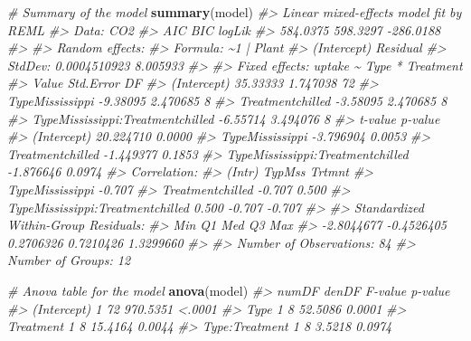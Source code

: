 \documentclass[
]{book}
\newenvironment{Shaded}{\begin{snugshade}}{\end{snugshade}}
\newcommand{\CommentTok}[1]{\textcolor[rgb]{0.56,0.35,0.01}{\textit{#1}}}
\newcommand{\FunctionTok}[1]{\textcolor[rgb]{0.13,0.29,0.53}{\textbf{#1}}}
\newcommand{\NormalTok}[1]{#1}
\begin{document}
\begin{Shaded}
\begin{Highlighting}[]
\CommentTok{\# Summary of the model}
\FunctionTok{summary}\NormalTok{(model)}
\CommentTok{\#\textgreater{} Linear mixed{-}effects model fit by REML}
\CommentTok{\#\textgreater{}   Data: CO2 }
\CommentTok{\#\textgreater{}        AIC      BIC    logLik}
\CommentTok{\#\textgreater{}   584.0375 598.3297 {-}286.0188}
\CommentTok{\#\textgreater{} }
\CommentTok{\#\textgreater{} Random effects:}
\CommentTok{\#\textgreater{}  Formula: \textasciitilde{}1 | Plant}
\CommentTok{\#\textgreater{}          (Intercept) Residual}
\CommentTok{\#\textgreater{} StdDev: 0.0004510923 8.005933}
\CommentTok{\#\textgreater{} }
\CommentTok{\#\textgreater{} Fixed effects:  uptake \textasciitilde{} Type * Treatment }
\CommentTok{\#\textgreater{}                                     Value Std.Error DF}
\CommentTok{\#\textgreater{} (Intercept)                      35.33333  1.747038 72}
\CommentTok{\#\textgreater{} TypeMississippi                  {-}9.38095  2.470685  8}
\CommentTok{\#\textgreater{} Treatmentchilled                 {-}3.58095  2.470685  8}
\CommentTok{\#\textgreater{} TypeMississippi:Treatmentchilled {-}6.55714  3.494076  8}
\CommentTok{\#\textgreater{}                                    t{-}value p{-}value}
\CommentTok{\#\textgreater{} (Intercept)                      20.224710  0.0000}
\CommentTok{\#\textgreater{} TypeMississippi                  {-}3.796904  0.0053}
\CommentTok{\#\textgreater{} Treatmentchilled                 {-}1.449377  0.1853}
\CommentTok{\#\textgreater{} TypeMississippi:Treatmentchilled {-}1.876646  0.0974}
\CommentTok{\#\textgreater{}  Correlation: }
\CommentTok{\#\textgreater{}                                  (Intr) TypMss Trtmnt}
\CommentTok{\#\textgreater{} TypeMississippi                  {-}0.707              }
\CommentTok{\#\textgreater{} Treatmentchilled                 {-}0.707  0.500       }
\CommentTok{\#\textgreater{} TypeMississippi:Treatmentchilled  0.500 {-}0.707 {-}0.707}
\CommentTok{\#\textgreater{} }
\CommentTok{\#\textgreater{} Standardized Within{-}Group Residuals:}
\CommentTok{\#\textgreater{}        Min         Q1        Med         Q3        Max }
\CommentTok{\#\textgreater{} {-}2.8044677 {-}0.4526405  0.2706326  0.7210426  1.3299660 }
\CommentTok{\#\textgreater{} }
\CommentTok{\#\textgreater{} Number of Observations: 84}
\CommentTok{\#\textgreater{} Number of Groups: 12}

\CommentTok{\# Anova table for the model}
\FunctionTok{anova}\NormalTok{(model)}
\CommentTok{\#\textgreater{}                numDF denDF  F{-}value p{-}value}
\CommentTok{\#\textgreater{} (Intercept)        1    72 970.5351  \textless{}.0001}
\CommentTok{\#\textgreater{} Type               1     8  52.5086  0.0001}
\CommentTok{\#\textgreater{} Treatment          1     8  15.4164  0.0044}
\CommentTok{\#\textgreater{} Type:Treatment     1     8   3.5218  0.0974}
\end{Highlighting}
\end{Shaded}
\end{document}
